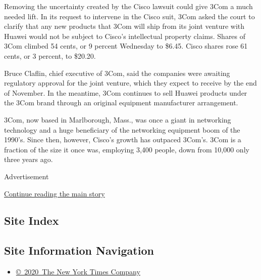 Removing the uncertainty created by the Cisco lawsuit could give 3Com a
much needed lift. In its request to intervene in the Cisco suit, 3Com
asked the court to clarify that any new products that 3Com will ship
from its joint venture with Huawei would not be subject to Cisco's
intellectual property claims. Shares of 3Com climbed 54 cents, or 9
percent Wednesday to \$6.45. Cisco shares rose 61 cents, or 3 percent,
to \$20.20.

Bruce Claflin, chief executive of 3Com, said the companies were awaiting
regulatory approval for the joint venture, which they expect to receive
by the end of November. In the meantime, 3Com continues to sell Huawei
products under the 3Com brand through an original equipment manufacturer
arrangement.

3Com, now based in Marlborough, Mass., was once a giant in networking
technology and a huge beneficiary of the networking equipment boom of
the 1990's. Since then, however, Cisco's growth has outpaced 3Com's.
3Com is a fraction of the size it once was, employing 3,400 people, down
from 10,000 only three years ago.

Advertisement

\protect\hyperlink{after-bottom}{Continue reading the main story}

\hypertarget{site-index}{%
\subsection{Site Index}\label{site-index}}

\hypertarget{site-information-navigation}{%
\subsection{Site Information
Navigation}\label{site-information-navigation}}

\begin{itemize}
\tightlist
\item
  \href{https://help.nytimes.com/hc/en-us/articles/115014792127-Copyright-notice}{©~2020~The
  New York Times Company}
\end{itemize}

